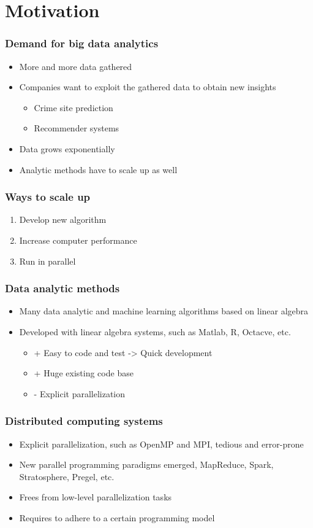\section{Motivation}

\begin{frame}
	\frametitle{Demand for big data analytics}
	\begin{itemize}
		\item More and more data gathered
		\item Companies want to exploit the gathered data to obtain new insights
		\begin{itemize}
			\item Crime site prediction
			\item Recommender systems
		\end{itemize}
		\item Data grows exponentially
		\item Analytic methods have to scale up as well
	\end{itemize}
\end{frame}

\begin{frame}
	\frametitle{Ways to scale up}
	\begin{enumerate}
		\item Develop new algorithm
		\item Increase computer performance
		\item Run in parallel
	\end{enumerate}
\end{frame}

\begin{frame}
	\frametitle{Data analytic methods}
	\begin{itemize}
		\item Many data analytic and machine learning algorithms based on linear algebra
		\item Developed with linear algebra systems, such as Matlab, R, Octacve, etc.
		\begin{itemize}
			\item + Easy to code and test -> Quick development
			\item + Huge existing code base
			\item - Explicit parallelization
		\end{itemize}
	\end{itemize}
\end{frame}

\begin{frame}
	\frametitle{Distributed computing systems}
	\begin{itemize}
		\item Explicit parallelization, such as OpenMP and MPI, tedious and error-prone
		\item New parallel programming paradigms emerged, MapReduce, Spark, Stratosphere, Pregel, etc.
		\item Frees from low-level parallelization tasks
		\item Requires to adhere to a certain programming model
	\end{itemize}
\end{frame}

